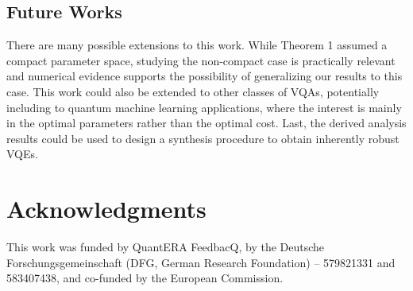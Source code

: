 \documentclass[letterpaper, 10 pt]{IEEEtran}  %
\begin{document}
\subsection{Future Works}
There are many possible extensions to this work. While Theorem 1 assumed a compact parameter space, studying the non-compact case is practically relevant
and numerical evidence supports the possibility of generalizing our results to this case. 
This work could also be extended to other classes of VQAs, potentially including to quantum machine learning applications, where the interest is mainly in the optimal parameters rather than the optimal cost.   
Last, the derived analysis results could be used to design a synthesis procedure to obtain inherently robust VQEs. 


\section*{Acknowledgments} 

This work was funded by QuantERA FeedbacQ, by the Deutsche Forschungsgemeinschaft (DFG, German
Research Foundation) – 579821331 and 583407438, and co-funded by the European Commission.



\end{document}
